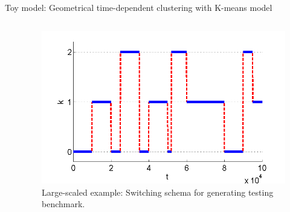 \documentclass[final,hyperref={pdfpagelabels=false}]{beamer}
\begin{document}
\begin{frame}[t]
\begin{columns}[t]
\begin{column}{.48\textwidth}
\begin{block}{Toy model: Geometrical time-dependent clustering with K-means model}
\begin{columns}[T]
\begin{column}{0.02\linewidth}\end{column}
\begin{column}{0.46\linewidth}
	\begin{figure}[H]
		\begin{center}
			\includegraphics[width=1.0\linewidth, angle=0, clip = true]{figures/generator.png}
			\caption{Large-scaled example: Switching schema for generating testing benchmark.
					 }
			\label{fig:kmeans_pizdaint1}	
		\end{center}
	\end{figure}


\end{column}
\end{columns}
\end{block}
\end{column}
\end{columns}
\end{frame}
\end{document}
